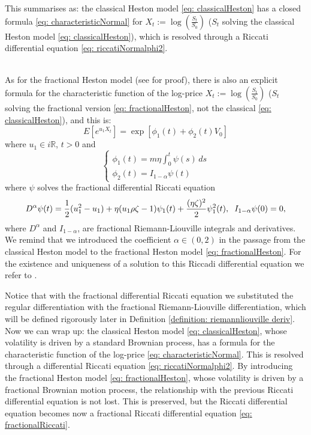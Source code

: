 \documentclass[a4paper,italian,11pt]{book}
\theoremstyle{plain}
\theoremstyle{remark}
\theoremstyle{plain}
\begin{document}
This summarises as: the classical Heston model \eqref{eq: classicalHeston} has a closed formula \eqref{eq: characteristicNormal} for $X_t := \log(\frac{S_t}{S_0}) $ ($S_t$ solving the classical Heston model \eqref{eq: classicalHeston}), which is resolved through a Riccati differential equation \eqref{eq: riccatiNormalphi2}.
\\\

As for the fractional Heston model (see \cite{Omar} for proof), there is also an explicit formula for the characteristic function of the log-price $X_t:= \log(\frac{S_t}{S_0})$ ($S_t$ solving the fractional version \eqref{eq: fractionalHeston}, not the classical \eqref{eq: classicalHeston}), and this is:
\begin{equation}
    \label{eq: firstSolForHestonModel}
    E[e^{u_1X_t}] = \exp[\phi_1(t) + \phi_2(t)V_0]
\end{equation}
where $u_1\in i\mathbb{R}$, $t>0$ and
\begin{equation}
    \label{eq: phisofHestonFract}
    \begin{cases}
    \phi_1(t)= m \eta \int_0^t \psi(s)\, ds \\
    \phi_2(t) = I_{1-\alpha} \psi(t)
    \end{cases}
\end{equation}
where $\psi$ solves the fractional differential Riccati equation 
\begin{equation}
    \label{eq: fractionalRiccati}
    D^\alpha \psi(t) = \frac{1}{2}(u_1^2-u_1) + \eta (u_1 \rho \zeta-1) \psi_1(t)  +\frac{(\eta \zeta)^2}{2}\psi_1^2(t), \hspace{0.2cm} I_{1-\alpha}\psi(0)=0,
\end{equation}
where $D^\alpha$ and $I_{1-\alpha}$, are fractional Riemann-Liouville integrals and derivatives. We remind that we introduced the coefficient $\alpha \in (0,2)$ in the passage from the classical Heston model to the fractional Heston model \eqref{eq: fractionalHeston}. For the existence and uniqueness of a solution to this Riccadi differential equation we refer to \cite{Omar}.

Notice that with the fractional differential Riccati equation we substituted the regular differentiation with the fractional Riemann-Liouville differentiation, which will be defined rigorously later in Definition \ref{definition: riemannliouville deriv}.
\\

Now we can wrap up: the classical Heston model \eqref{eq: classicalHeston}, whose volatility is driven by a standard Brownian process, has a formula for the characteristic function of the log-price \eqref{eq: characteristicNormal}. 
This is resolved through a differential Riccati equation \eqref{eq: riccatiNormalphi2}. 
By introducing the fractional Heston model \eqref{eq: fractionalHeston}, whose volatility is driven by a fractional Brownian motion process, the relationship with the previous Riccati differential equation is not lost. 
This is preserved, but the Riccati differential equation becomes now a fractional Riccati differential equation \eqref{eq: fractionalRiccati}.
\\\
\\
\end{document}
